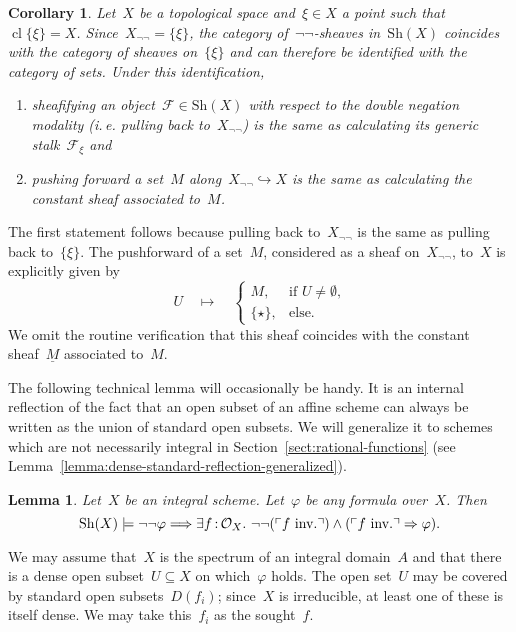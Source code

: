 \documentclass[10pt,reqno,a4paper]{amsbook}
\makeatletter
\theoremstyle{definition}
\theoremstyle{plain}
\newtheorem{cor}[defn]{Corollary}
\newtheorem{lemma}[defn]{Lemma}
\theoremstyle{remark}
\newcommand{\F}{\mathcal{F}}
\renewcommand{\O}{\mathcal{O}}
\newcommand{\Sh}{\mathrm{Sh}}
\DeclareMathOperator{\Clos}{cl}
\newcommand{\?}{\,{:}\,}
\renewcommand{\_}{\mathpunct{.}\,}
\newcommand{\speak}[1]{\ulcorner\text{\textnormal{#1}}\urcorner}
\newcommand{\ie}{i.\,e.\@\xspace}
\newcommand{\inv}{inv.\@}
\renewenvironment{proof}[1][\proofname]{\par
  \pushQED{\qed}%
  \normalfont \topsep6\p@\@plus6\p@\relax
  \trivlist
  \item[\hskip\labelsep
        \itshape
    #1\@addpunct{.}]\ignorespaces
}{%
  \popQED\endtrivlist\@endpefalse
}
\makeatother
\begin{document}
\begin{cor}\label{cor:negneg-generic-point-pushpull}
Let~$X$ be a topological space and~$\xi \in X$ a point such
that~$\Clos\{\xi\} = X$. Since~$X_{\neg\neg} = \{\xi\}$, the
category of~$\neg\neg$-sheaves in~$\Sh(X)$ coincides with the category of
sheaves on~$\{\xi\}$ and can therefore be identified with the category of sets.
Under this identification,
\begin{enumerate}
\item sheafifying an object~$\F \in \Sh(X)$ with respect
to the double negation modality (\ie pulling back to~$X_{\neg\neg}$) is the
same as calculating its generic stalk~$\F_\xi$ and
\item pushing forward a set~$M$ along~$X_{\neg\neg} \hookrightarrow X$ is the
same as calculating the constant sheaf associated to~$M$.
\end{enumerate}
\end{cor}
\begin{proof}The first statement follows because pulling back to~$X_{\neg\neg}$
is the same as pulling back to~$\{\xi\}$. The pushforward of a set~$M$,
considered as a sheaf on~$X_{\neg\neg}$, to~$X$ is explicitly given by
\[ U \quad\longmapsto\quad \begin{cases}
  M, & \text{if $U \neq \emptyset$,} \\
  \{\star\}, & \text{else.}
\end{cases} \]
We omit the routine verification that this sheaf coincides with the constant
sheaf~$\underline{M}$ associated to~$M$.
\end{proof}

The following technical lemma will occasionally be handy. It is an internal
reflection of the fact that an open subset of an affine scheme can always be
written as the union of standard open subsets. We will generalize it
to schemes which are not necessarily integral in
Section~\ref{sect:rational-functions} (see
Lemma~\ref{lemma:dense-standard-reflection-generalized}).

\begin{lemma}\label{lemma:dense-standard-reflection}
Let~$X$ be an integral scheme. Let~$\varphi$ be any formula
over~$X$. Then
\[ \Sh(X) \models \neg\neg\varphi \Longrightarrow \exists f\?\O_X\_
  \neg\neg(\speak{$f$ \inv}) \wedge (\speak{$f$ \inv} \Rightarrow \varphi). \]
\end{lemma}
\begin{proof}We may assume that~$X$ is the spectrum of an integral domain~$A$
and that there is a dense open subset~$U \subseteq X$ on which~$\varphi$ holds.
The open set~$U$ may be covered by standard open subsets~$D(f_i)$; since~$X$ is
irreducible, at least one of these is itself
dense. We may take this~$f_i$ as the sought~$f$.
\end{proof}
\end{document}
